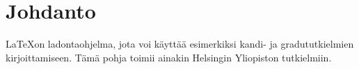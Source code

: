 \section{Johdanto}

\LaTeX on ladontaohjelma, jota voi käyttää esimerkiksi kandi- ja
gradututkielmien kirjoittamiseen. Tämä pohja toimii ainakin Helsingin
Yliopiston tutkielmiin.
